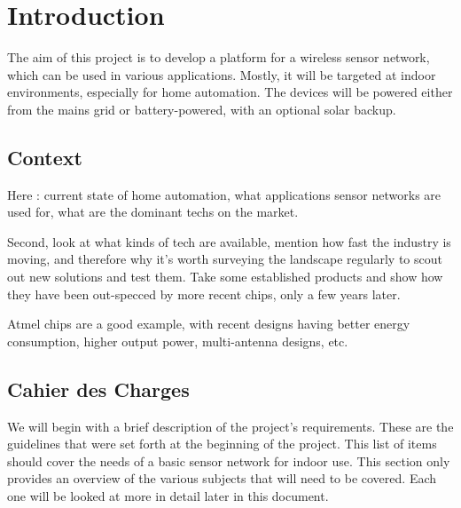 \chapter{Introduction}\label{ch:introduction}

The aim of this project is to develop a platform for a wireless sensor network,
which can be used in various applications. Mostly, it will be targeted at indoor
environments, especially for home automation. The devices will be powered either
from the mains grid or battery-powered, with an optional solar backup.


\section{Context}\label{sec:context}

Here : current state of home automation, what applications sensor networks are
used for, what are the dominant techs on the market.

Second, look at what kinds of tech are available, mention how fast the industry
is moving, and therefore why it's worth surveying the landscape regularly to
scout out new solutions and test them. Take some established products and show
how they have been out-specced by more recent chips, only a few years later. 

Atmel chips are a good example, with recent designs having better energy
consumption, higher output power, multi-antenna designs, etc.

\section{Cahier des Charges}\label{sec:cdc}

We will begin with a brief description of the project's requirements. These are
the guidelines that were set forth at the beginning of the project. This list of
items should cover the needs of a basic sensor network for indoor use. This
section only provides an overview of the various subjects that will need to be
covered. Each one will be looked at more in detail later in this document.

